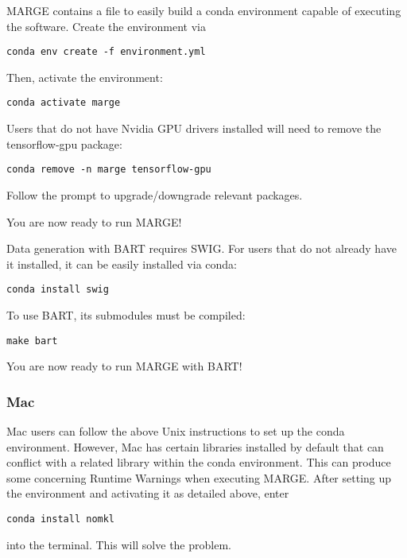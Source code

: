 \documentclass[letterpaper, 12pt]{article}
\begin{document}
\noindent MARGE contains a file to easily build a conda environment capable of 
executing the software.  Create the environment via
\begin{verbatim}
conda env create -f environment.yml
\end{verbatim}
\newline

\noindent Then, activate the environment:
\begin{verbatim}
conda activate marge
\end{verbatim}
\newline

\noindent Users that do not have Nvidia GPU drivers installed will need to 
remove the tensorflow-gpu package:
\begin{verbatim}
conda remove -n marge tensorflow-gpu
\end{verbatim}
\noindent Follow the prompt to upgrade/downgrade relevant packages.

\newline

\noindent You are now ready to run MARGE!

\newline

\noindent Data generation with BART requires SWIG.  For users that do not 
already have it installed, it can be easily installed via conda:
\begin{verbatim}
conda install swig
\end{verbatim}
\newline

\noindent To use BART, its submodules must be compiled:
\begin{verbatim}
make bart
\end{verbatim}
\newline

\noindent You are now ready to run MARGE with BART!


\subsubsection{Mac}

Mac users can follow the above Unix instructions to set up the conda 
environment.  However, Mac has certain libraries installed by default that 
can conflict with a related library within the conda environment.  This can 
produce some concerning Runtime Warnings when executing MARGE.  After setting 
up the environment and activating it as detailed above, enter 
\begin{verbatim}
conda install nomkl
\end{verbatim}
\noindent into the terminal.  This will solve the problem.
\end{document}
